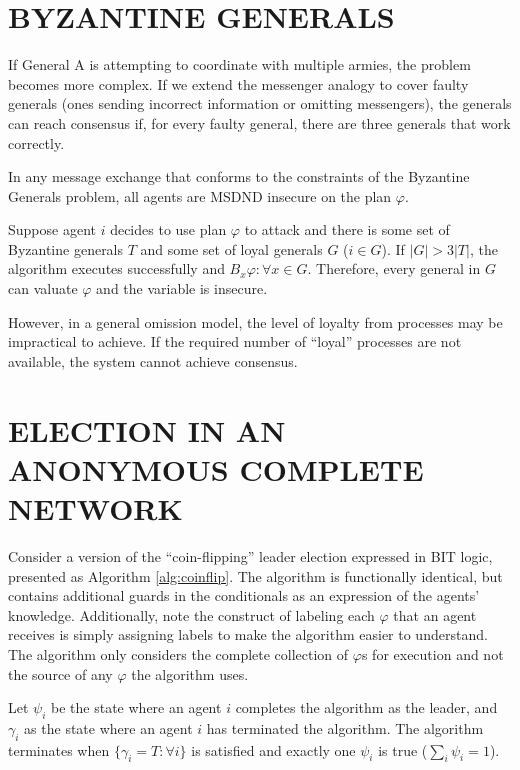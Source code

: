 \section{BYZANTINE GENERALS}

If General A is attempting to coordinate with multiple armies, the problem becomes more complex.
If we extend the messenger analogy to cover faulty generals (ones sending incorrect information or omitting messengers), the generals can reach consensus if, for every faulty general, there are three generals that work correctly.\cite{byzantine-generals}

\begin{thm}
In any message exchange that conforms to the constraints of the Byzantine Generals problem, all agents are MSDND insecure on the plan $\varphi$.
\end{thm}
\begin{prooftight}
Suppose agent $i$ decides to use plan $\varphi$ to attack and there is some set of Byzantine generals $T$ and some set of loyal generals $G$ ($i \in G$). If $|G| > 3|T|$, the algorithm executes successfully and $B_x \varphi : \forall x \in G$. Therefore, every general in $G$ can valuate $\varphi$ and the variable is insecure.
\end{prooftight}

However, in a general omission model, the level of loyalty from processes may be impractical to achieve.
If the required number of ``loyal'' processes are not available, the system cannot achieve consensus.

\section{ELECTION IN AN ANONYMOUS COMPLETE NETWORK}


Consider a version of the ``coin-flipping'' leader election\cite{DISTRIBUTED} expressed in BIT logic, presented as Algorithm \ref{alg:coinflip}.
The algorithm is functionally identical, but contains additional guards in the conditionals as an expression of the agents' knowledge.
Additionally, note the construct of labeling each $\varphi$ that an agent receives is simply assigning labels to make the algorithm easier to understand.
The algorithm only considers the complete collection of $\varphi$s for execution and not the source of any $\varphi$ the algorithm uses.

Let $\psi_i$ be the state where an agent $i$ completes the algorithm as the leader, and $\gamma_i$ as the state where an agent $i$ has terminated the algorithm.
The algorithm terminates when $\{\gamma_i = T : \forall i \}$ is satisfied and exactly one $\psi_i$ is true ($\sum_i \psi_i = 1$).

